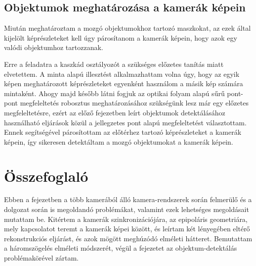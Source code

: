 \subsection{Objektumok meghatározása a kamerák képein}

Miután meghatároztam a mozgó objektumokhoz tartozó maszkokat, az ezek által kijelölt képrészleteket kell úgy párosítanom a kamerák képein, hogy azok egy valódi objektumhoz tartozzanak.

Erre a feladatra a kaszkád osztályozót a szükséges előzetes tanítás miatt elvetettem. A minta alapú illesztést alkalmazhattam volna úgy, hogy az egyik képen meghatározott képrészleteket egyenként használom a másik kép számára mintaként. Ahogy majd később látni fogjuk az optikai folyam alapú sűrű pont-pont megfeleltetés robosztus meghatározásához szükségünk lesz már egy előzetes megfeleltetésre, ezért az előző fejezetben leírt objektumok detektálásához használható eljárások közül a jellegzetes pont alapú megfeleltetést választottam. Ennek segítségével párosítottam az előtérhez tartozó képrészleteket a kamerák képein, így sikeresen detektáltam a mozgó objektumokat a kamerák képein.

\section{Összefoglaló}

Ebben a fejezetben a több kamerából álló kamera-rendszerek során felmerülő és a dolgozat során is megoldandó problémákat, valamint ezek lehetséges megoldásait mutattam be. Kitértem a kamerák szinkronizációjára, az epipoláris geometriára, mely kapcsolatot teremt a kamerák képei között, és leírtam két lényegében eltérő rekonstrukciós eljárást, és azok mögött meghúzódó elméleti hátteret. Bemutattam a háromszögelés elméleti módszerét, végül a fejezetet az objektum-detektálás problémakörével zártam.